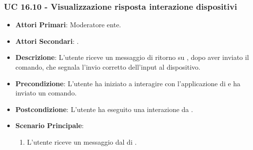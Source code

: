 	\subsubsection{UC 16.10 - Visualizzazione risposta interazione dispositivi}
		
		\begin{itemize}
			\item \textbf{Attori Primari}: Moderatore ente.
			\item \textbf{Attori Secondari}: .
			\item \textbf{Descrizione}: L'utente riceve un messaggio di ritorno su , dopo aver inviato il comando, che segnala l'invio corretto dell'input al dispositivo. 
			\item \textbf{Precondizione}: L'utente ha iniziato a interagire con l'applicazione di  e ha inviato un comando.
			\item \textbf{Postcondizione}: L'utente ha eseguito una interazione da .
			\item \textbf{Scenario Principale}:
			\begin{enumerate}
				\item L'utente riceve un messaggio dal  di .
			\end{enumerate}
		\end{itemize}	



		




